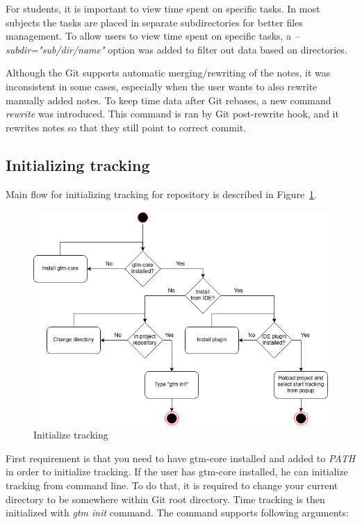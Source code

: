 For students, it is important to view time spent on specific tasks.
In most subjects the tasks are placed in separate subdirectories for better files management.
To allow users to view time spent on specific tasks, a \textit{--subdir="sub/dir/name"} option was added to filter out
data based on directories.

Although the Git supports automatic merging/rewriting of the notes, it was inconsistent in some cases, especially when the user
wants to also rewrite manually added notes.
To keep time data after Git rebases, a new command \textit{rewrite} was introduced.
This command is ran by Git post-rewrite hook, and it rewrites notes so that they still point to correct commit.

\subsection{Initializing tracking}\label{subsec:init-tracking}
Main flow for initializing tracking for repository is described in Figure~\ref{fig:init-tracking}.
\begin{figure}[h]
    \includegraphics[width=\textwidth]{figures/init_tracking}
    \caption{Initialize tracking}
    \label{fig:init-tracking}
\end{figure}

First requirement is that you need to have gtm-core installed and added to \textit{PATH} in order to initialize tracking.
If the user has gtm-core installed, he can initialize tracking from command line.
To do that, it is required to change your current directory to be somewhere within Git root directory.
Time tracking is then initialized with \textit{gtm init} command.
The command supports following arguments:

